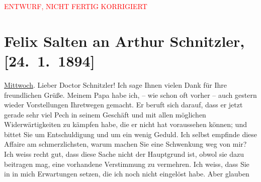
\begin{center}
            \textcolor{red}{ENTWURF, NICHT FERTIG KORRIGIERT}
                      \end{center}
            
         
         \renewcommand{\erwaehntePersonen}{Personen: Philipp Salzmann}
         \renewcommand{\erwaehnteOrte}{Orte: Wien}
         \renewcommand{\erwaehnteWerke}{}
               \section[Felix Salten an Arthur Schnitzler, {[}24. 1. 1894{]}]{ Felix Salten an Arthur Schnitzler, {[}24. 1. 1894{]}}\nopagebreak{}\rehead{ }\begin{ledgroupsized}[t]{13cm}\normalsize\beginnumbering \toendnotes[C]{\smallbreak\pagebreak[2]} 
\toendnotes[C]{\smallbreak}\pstart
           {\pb}\uline{Mittwoch}.\pend
           \pstart
           Lieber Doctor Schnitzler! Ich sage Ihnen vielen Dank für Ihre
               freundlichen Grüße. Meinem Papa habe ich, – wie schon oft vorher – auch gestern wieder Vorstellungen
               Ihretwegen gemacht. Er beruft sich darauf, dass er jetzt gerade sehr viel Pech in
               seinem Geschäft und mit allen möglichen Widerwärtigkeiten zu kämpfen habe, die er
               nicht hat voraussehen können; und bittet Sie um Entschuldigung und um ein wenig
               Geduld. Ich selbst {\pb}empfinde diese Affaire am schmerzlichsten, warum machen Sie eine Schwenkung weg von
               mir? Ich weiss recht gut, dass diese Sache nicht der Hauptgrund ist, obwol sie dazu
               beitragen mag, eine vorhandene Verstimmung zu vermehren. Ich weiss, dass Sie in
                  \label{K_L03132-1v}\label{K_L03132-1h} in mich Erwartungen setzen, die ich noch nicht eingelöst habe. Aber glauben

\end{ledgroupsized}
